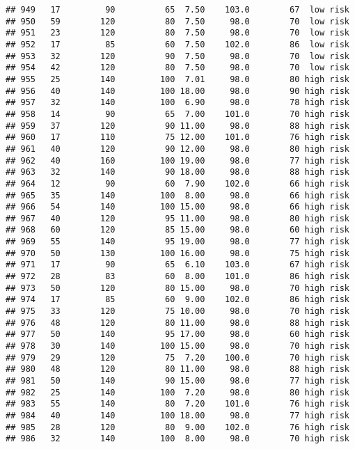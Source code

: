 \documentclass[
  ignorenonframetext,
]{beamer}
\begin{document}
\begin{frame}[fragile]
\begin{verbatim}
## 949   17         90          65  7.50    103.0        67  low risk
## 950   59        120          80  7.50     98.0        70  low risk
## 951   23        120          80  7.50     98.0        70  low risk
## 952   17         85          60  7.50    102.0        86  low risk
## 953   32        120          90  7.50     98.0        70  low risk
## 954   42        120          80  7.50     98.0        70  low risk
## 955   25        140         100  7.01     98.0        80 high risk
## 956   40        140         100 18.00     98.0        90 high risk
## 957   32        140         100  6.90     98.0        78 high risk
## 958   14         90          65  7.00    101.0        70 high risk
## 959   37        120          90 11.00     98.0        88 high risk
## 960   17        110          75 12.00    101.0        76 high risk
## 961   40        120          90 12.00     98.0        80 high risk
## 962   40        160         100 19.00     98.0        77 high risk
## 963   32        140          90 18.00     98.0        88 high risk
## 964   12         90          60  7.90    102.0        66 high risk
## 965   35        140         100  8.00     98.0        66 high risk
## 966   54        140         100 15.00     98.0        66 high risk
## 967   40        120          95 11.00     98.0        80 high risk
## 968   60        120          85 15.00     98.0        60 high risk
## 969   55        140          95 19.00     98.0        77 high risk
## 970   50        130         100 16.00     98.0        75 high risk
## 971   17         90          65  6.10    103.0        67 high risk
## 972   28         83          60  8.00    101.0        86 high risk
## 973   50        120          80 15.00     98.0        70 high risk
## 974   17         85          60  9.00    102.0        86 high risk
## 975   33        120          75 10.00     98.0        70 high risk
## 976   48        120          80 11.00     98.0        88 high risk
## 977   50        140          95 17.00     98.0        60 high risk
## 978   30        140         100 15.00     98.0        70 high risk
## 979   29        120          75  7.20    100.0        70 high risk
## 980   48        120          80 11.00     98.0        88 high risk
## 981   50        140          90 15.00     98.0        77 high risk
## 982   25        140         100  7.20     98.0        80 high risk
## 983   55        140          80  7.20    101.0        76 high risk
## 984   40        140         100 18.00     98.0        77 high risk
## 985   28        120          80  9.00    102.0        76 high risk
## 986   32        140         100  8.00     98.0        70 high risk

\end{verbatim}
\end{frame}
\end{document}
